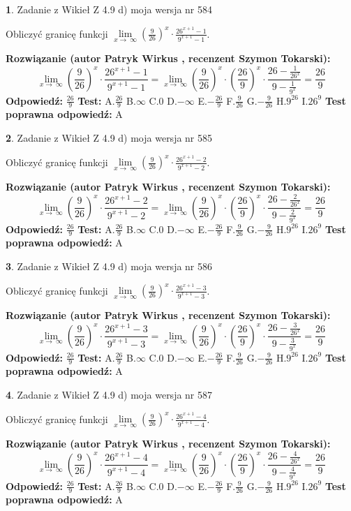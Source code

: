 \documentclass[12pt, a4paper]{article}
\theoremstyle{definition} %
\newtheorem{zad}{}
\newcommand{\zadStart}[1]{\begin{zad}#1\newline}
\newcommand{\zadStop}{\end{zad}}
\newcommand{\rozwStart}[2]{\noindent \textbf{Rozwiązanie (autor #1 , recenzent #2): }\newline}
\newcommand{\rozwStop}{\newline}
\newcommand{\odpStart}{\noindent \textbf{Odpowiedź:}\newline}
\newcommand{\odpStop}{\newline}
\newcommand{\testStart}{\noindent \textbf{Test:}\newline}
\newcommand{\testStop}{\newline}
\newcommand{\kluczStart}{\noindent \textbf{Test poprawna odpowiedź:}\newline}
\newcommand{\kluczStop}{\newline}
\begin{document}
\zadStart{Zadanie z Wikieł Z 4.9 d) moja wersja nr 584}


Obliczyć granicę funkcji  $\lim\limits_{x\to\ \infty}(\frac{9}{26})^{x}\cdot\frac{26^{x+1}-1}{9^{x+1}-1}$.
\zadStop
\rozwStart{Patryk Wirkus}{Szymon Tokarski}
$$\lim\limits_{x\to\ \infty}(\frac{9}{26})^{x}\cdot\frac{26^{x+1}-1}{9^{x+1}-1}=\lim\limits_{x\to\ \infty}(\frac{9}{26})^{x}\cdot(\frac{26}{9})^{x} \cdot \frac{26-\frac{1}{26^{x}}}{9-\frac{1}{9^{x}}} = \frac{26}{9}$$
\rozwStop
\odpStart
$\frac{26}{9}$
\odpStop
\testStart
A.$\frac{26}{9}$ B.$\infty$ C.$0$ D.$-\infty$ E.$-\frac{26}{9}$
F.$\frac{9}{26}$ G.$-\frac{9}{26}$
H.$9^{26}$
I.$26^{9}$
\testStop
\kluczStart
A
\kluczStop



\zadStart{Zadanie z Wikieł Z 4.9 d) moja wersja nr 585}


Obliczyć granicę funkcji  $\lim\limits_{x\to\ \infty}(\frac{9}{26})^{x}\cdot\frac{26^{x+1}-2}{9^{x+1}-2}$.
\zadStop
\rozwStart{Patryk Wirkus}{Szymon Tokarski}
$$\lim\limits_{x\to\ \infty}(\frac{9}{26})^{x}\cdot\frac{26^{x+1}-2}{9^{x+1}-2}=\lim\limits_{x\to\ \infty}(\frac{9}{26})^{x}\cdot(\frac{26}{9})^{x} \cdot \frac{26-\frac{2}{26^{x}}}{9-\frac{2}{9^{x}}} = \frac{26}{9}$$
\rozwStop
\odpStart
$\frac{26}{9}$
\odpStop
\testStart
A.$\frac{26}{9}$ B.$\infty$ C.$0$ D.$-\infty$ E.$-\frac{26}{9}$
F.$\frac{9}{26}$ G.$-\frac{9}{26}$
H.$9^{26}$
I.$26^{9}$
\testStop
\kluczStart
A
\kluczStop



\zadStart{Zadanie z Wikieł Z 4.9 d) moja wersja nr 586}


Obliczyć granicę funkcji  $\lim\limits_{x\to\ \infty}(\frac{9}{26})^{x}\cdot\frac{26^{x+1}-3}{9^{x+1}-3}$.
\zadStop
\rozwStart{Patryk Wirkus}{Szymon Tokarski}
$$\lim\limits_{x\to\ \infty}(\frac{9}{26})^{x}\cdot\frac{26^{x+1}-3}{9^{x+1}-3}=\lim\limits_{x\to\ \infty}(\frac{9}{26})^{x}\cdot(\frac{26}{9})^{x} \cdot \frac{26-\frac{3}{26^{x}}}{9-\frac{3}{9^{x}}} = \frac{26}{9}$$
\rozwStop
\odpStart
$\frac{26}{9}$
\odpStop
\testStart
A.$\frac{26}{9}$ B.$\infty$ C.$0$ D.$-\infty$ E.$-\frac{26}{9}$
F.$\frac{9}{26}$ G.$-\frac{9}{26}$
H.$9^{26}$
I.$26^{9}$
\testStop
\kluczStart
A
\kluczStop



\zadStart{Zadanie z Wikieł Z 4.9 d) moja wersja nr 587}


Obliczyć granicę funkcji  $\lim\limits_{x\to\ \infty}(\frac{9}{26})^{x}\cdot\frac{26^{x+1}-4}{9^{x+1}-4}$.
\zadStop
\rozwStart{Patryk Wirkus}{Szymon Tokarski}
$$\lim\limits_{x\to\ \infty}(\frac{9}{26})^{x}\cdot\frac{26^{x+1}-4}{9^{x+1}-4}=\lim\limits_{x\to\ \infty}(\frac{9}{26})^{x}\cdot(\frac{26}{9})^{x} \cdot \frac{26-\frac{4}{26^{x}}}{9-\frac{4}{9^{x}}} = \frac{26}{9}$$
\rozwStop
\odpStart
$\frac{26}{9}$
\odpStop
\testStart
A.$\frac{26}{9}$ B.$\infty$ C.$0$ D.$-\infty$ E.$-\frac{26}{9}$
F.$\frac{9}{26}$ G.$-\frac{9}{26}$
H.$9^{26}$
I.$26^{9}$
\testStop
\kluczStart
A
\kluczStop
\end{document}
